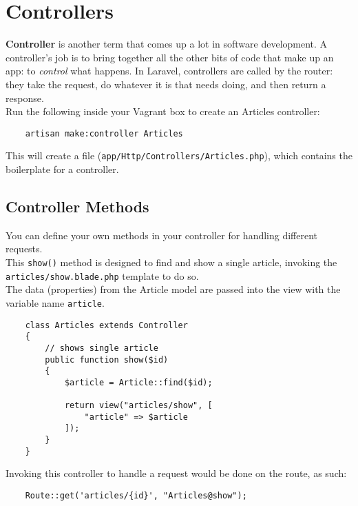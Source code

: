 \section{Controllers}

\textbf{Controller} is another term that comes up a lot in software development. A controller's job is to bring together all the other bits of code that make up an app: to \textit{control} what happens. In Laravel, controllers are called by the router: they take the request, do whatever it is that needs doing, and then return a response.
\\

Run the following inside your Vagrant box to create an Articles controller:

\begin{verbatim}
    artisan make:controller Articles
\end{verbatim}

This will create a file (\texttt{app/Http/Controllers/Articles.php}), which contains the boilerplate for a controller.
\\

\subsection{Controller Methods}

You can define your own methods in your controller for handling different requests.
\\

This \texttt{show()} method is designed to find and show a single article, invoking the \texttt{articles/show.blade.php} template to do so.
\\

The data (properties) from the Article model are passed into the view with the variable name \texttt{article}.

\begin{verbatim}
    class Articles extends Controller
    {
        // shows single article
        public function show($id)
        {
            $article = Article::find($id);

            return view("articles/show", [
                "article" => $article
            ]);
        }
    }
\end{verbatim}

Invoking this controller to handle a request would be done on the route, as such:

\begin{verbatim}
    Route::get('articles/{id}', "Articles@show");
\end{verbatim}

